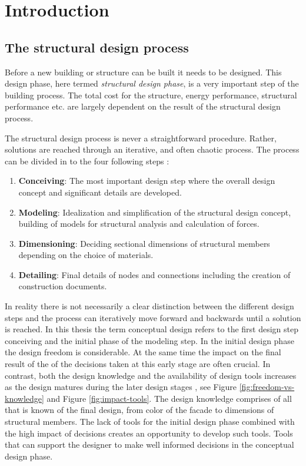 \chapter{Introduction}
\label{ch:Introduction}
\section{The structural design process}
Before a new building or structure can be built it needs to be designed. This design phase, here termed \textit{structural design phase}, is a very important step of the building process. The total cost for the structure, energy performance, structural performance etc. are largely dependent on the result of the structural design process. 

The structural design process is never a straightforward procedure. Rather, solutions are reached through an iterative, and often chaotic process. The process can be divided in to the four following steps \cite{schlaich2006challenges}:

\begin{enumerate}  
\item \textbf{Conceiving}: The most important design step where the overall design concept and significant details are developed.
\item \textbf{Modeling}: Idealization and simplification of the structural design concept, building of models for structural analysis and calculation of forces.
\item \textbf{Dimensioning}: Deciding sectional dimensions of structural members depending on the choice of materials.
\item \textbf{Detailing}: Final details of nodes and connections including the creation of construction documents.
\end{enumerate}

In reality there is not necessarily a clear distinction between the different design steps and the process can iteratively move forward and backwards until a solution is reached. In this thesis the term conceptual design refers to the first design step conceiving and the initial phase of the modeling step. In the initial design phase the design freedom is considerable. At the same time the impact on the final result of the of the decisions taken at this early stage are often crucial. In contrast, both the design knowledge and the availability of design tools increases as the design matures during the later design stages \cite{schlaich2006challenges} \cite{Hsu2000}, see Figure \ref{fig:freedom-vs-knowledge} and Figure \ref{fig:impact-tools}. The design knowledge comprises of all that is known of the final design, from color of the facade to dimensions of structural members. The lack of tools for the initial design phase combined with the high impact of decisions creates an opportunity to develop such tools. Tools that can support the designer to make well informed decisions in the conceptual design phase.

